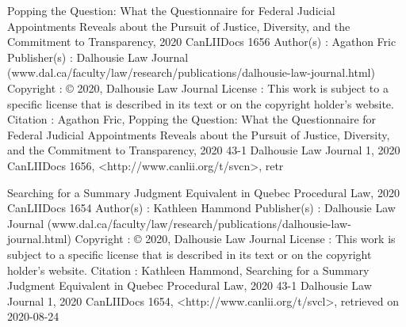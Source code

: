 \begingroup %
\makeatletter %
\extendtheindex%
{
\let\twocolumn\@firstoptofone %
\xoldtwocolumn
}%
{}%
{}%
{}%
\makeatother %
\printindex[general] %
\endgroup %





Popping the Question: What the Questionnaire for Federal Judicial Appointments Reveals about the Pursuit of Justice, Diversity, and the Commitment to Transparency, 2020 CanLIIDocs 1656
Author(s) : 	Agathon Fric
Publisher(s) : 	Dalhousie Law Journal (www.dal.ca/faculty/law/research/publications/dalhousie-law-journal.html)
Copyright : 	© 2020, Dalhousie Law Journal
License : 	This work is subject to a specific license that is described in its text or on the copyright holder's website.
Citation : 	Agathon Fric, Popping the Question: What the Questionnaire for Federal Judicial Appointments Reveals about the Pursuit of Justice, Diversity, and the Commitment to Transparency, 2020 43-1 Dalhousie Law Journal 1, 2020 CanLIIDocs 1656, <http://www.canlii.org/t/svcn>, retr



Searching for a Summary Judgment Equivalent in Quebec Procedural Law, 2020 CanLIIDocs 1654
Author(s) : 	Kathleen Hammond
Publisher(s) : 	Dalhousie Law Journal (www.dal.ca/faculty/law/research/publications/dalhousie-law-journal.html)
Copyright : 	© 2020, Dalhousie Law Journal
License : 	This work is subject to a specific license that is described in its text or on the copyright holder's website.
Citation : 	Kathleen Hammond, Searching for a Summary Judgment Equivalent in Quebec Procedural Law, 2020 43-1 Dalhousie Law Journal 1, 2020 CanLIIDocs 1654, <http://www.canlii.org/t/svcl>, retrieved on 2020-08-24




